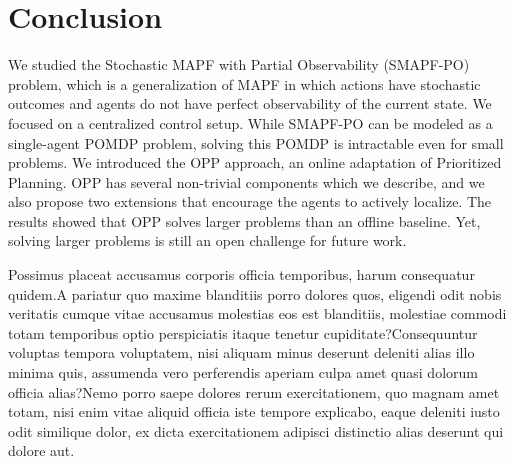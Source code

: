 \documentclass[letterpaper]{article} %
\begin{document}
\section{Conclusion}

We studied the Stochastic MAPF with Partial Observability (SMAPF-PO) problem, which is a generalization of MAPF in which actions have stochastic outcomes and agents do not have perfect observability of the current state. We focused on a centralized control setup. While SMAPF-PO can be modeled as a single-agent POMDP problem, solving this POMDP is intractable even for small problems.
We introduced the OPP approach, an online adaptation of Prioritized Planning. OPP has several non-trivial components which we describe, and we also propose two extensions that encourage the agents to actively localize. The results showed that OPP solves larger problems than an offline baseline.
Yet, solving larger problems is still an open challenge for future work.






Possimus placeat accusamus corporis officia temporibus, harum consequatur quidem.A pariatur quo maxime blanditiis porro dolores quos, eligendi odit nobis veritatis cumque vitae accusamus molestias eos est blanditiis, molestiae commodi totam temporibus optio perspiciatis itaque tenetur cupiditate?Consequuntur voluptas tempora voluptatem, nisi aliquam minus deserunt deleniti alias illo minima quis, assumenda vero perferendis aperiam culpa amet quasi dolorum officia alias?Nemo porro saepe dolores rerum exercitationem, quo magnam amet totam, nisi enim vitae aliquid officia iste tempore explicabo, eaque deleniti iusto odit similique dolor, ex dicta exercitationem adipisci distinctio alias deserunt qui dolore aut.\clearpage

\end{document}
